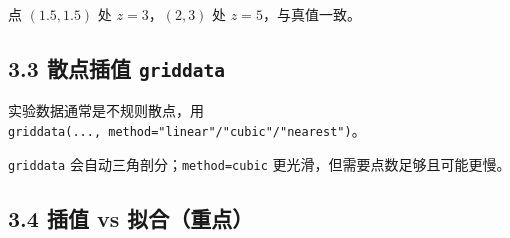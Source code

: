 \begin{Shaded}
\begin{Highlighting}[]
\NormalTok{[3. 5.]}
\end{Highlighting}
\end{Shaded}

点 \((1.5,1.5)\) 处 \(z=3\)，\((2,3)\) 处 \(z=5\)，与真值一致。

\subsection{\texorpdfstring{3.3 散点插值
\texttt{griddata}}{3.3 散点插值 griddata}}\label{ux6563ux70b9ux63d2ux503c-griddata}

实验数据通常是不规则散点，用
\texttt{griddata(...,\ method="linear"/"cubic"/"nearest")}。

\begin{Shaded}
\begin{Highlighting}[]
\OperatorTok{=}\NormalTok{)}
\OperatorTok{=}\NormalTok{, }\OperatorTok{=}\NormalTok{(}\NormalTok{, }\NormalTok{))       }
\OperatorTok{=}\NormalTok{ np.sin(pts[:, }\NormalTok{]}\OperatorTok{/}\NormalTok{) }\OperatorTok{+}\NormalTok{ np.cos(pts[:, }\NormalTok{]}\OperatorTok{/}\NormalTok{)}
\NormalTok{, }\NormalTok{)))}
\end{Highlighting}
\end{Shaded}

\begin{Shaded}
\begin{Highlighting}[]
\end{Highlighting}
\end{Shaded}

\texttt{griddata}
会自动三角剖分；\texttt{method=\textquotesingle{}cubic\textquotesingle{}}
更光滑，但需要点数足够且可能更慢。

\subsection{3.4 插值 vs
拟合（重点）}\label{ux63d2ux503c-vs-ux62dfux5408ux91cdux70b9}


